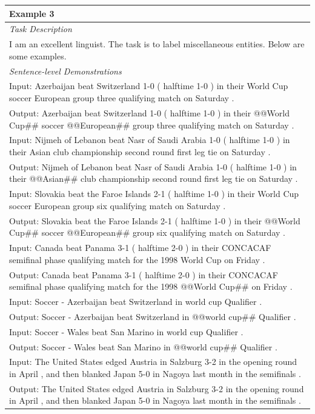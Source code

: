 \documentclass{article}
\begin{document}
\begin{table}[th!]
{\begin{tabular}{l}
\textbf{Example 3} \\\midrule
       	\textit{Task Description} \\
I am an excellent linguist. The task is to label miscellaneous entities. Below are some examples. \\\midrule
\textit{Sentence-level Demonstrations} \\
Input: Azerbaijan beat Switzerland 1-0 ( halftime 1-0 ) in their World Cup soccer European group three qualifying match on Saturday . \\
Output: Azerbaijan beat Switzerland 1-0 ( halftime 1-0 ) in their @@World Cup\#\# soccer @@European\#\# group three qualifying match on Saturday . \\
Input: Nijmeh of Lebanon beat Nasr of Saudi Arabia 1-0 ( halftime 1-0 ) in their Asian club championship second round first leg tie on Saturday . \\
Output: Nijmeh of Lebanon beat Nasr of Saudi Arabia 1-0 ( halftime 1-0 ) in their @@Asian\#\# club championship second round first leg tie on Saturday . \\
Input: Slovakia beat the Faroe Islands 2-1 ( halftime 1-0 ) in their World Cup soccer European group six qualifying match on Saturday . \\
Output: Slovakia beat the Faroe Islands 2-1 ( halftime 1-0 ) in their @@World Cup\#\# soccer @@European\#\# group six qualifying match on Saturday . \\
Input: Canada beat Panama 3-1 ( halftime 2-0 ) in their CONCACAF semifinal phase qualifying match for the 1998 World Cup on Friday . \\
Output: Canada beat Panama 3-1 ( halftime 2-0 ) in their CONCACAF semifinal phase qualifying match for the 1998 @@World Cup\#\# on Friday . \\
Input: Soccer - Azerbaijan beat Switzerland in world cup Qualifier . \\
Output: Soccer - Azerbaijan beat Switzerland in @@world cup\#\# Qualifier . \\
Input: Soccer - Wales beat San Marino in world cup Qualifier . \\
Output: Soccer - Wales beat San Marino in @@world cup\#\# Qualifier . \\
Input: The United States edged Austria in Salzburg 3-2 in the opening round in April , and then blanked Japan 5-0 in Nagoya last month in the semifinals . \\
Output: The United States edged Austria in Salzburg 3-2 in the opening round in April , and then blanked Japan 5-0 in Nagoya last month in the semifinals . \\

\end{tabular}}
\end{table}
\end{document}
